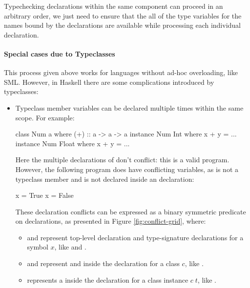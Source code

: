 \documentclass[dissertation.tex]{subfiles}
\begin{document}
{{        Typechecking declarations within the same component can proceed in an arbitrary order, we just need to ensure that the all of the type variables for the names bound by the declarations are available while processing each individual declaration.

        \paragraph*{Special cases due to Typeclasses}

        This process given above works for languages without ad-hoc overloading, like SML. However, in Haskell there are some complications introduced by typeclasses:

        \begin{itemize}
        \item
        {
            Typeclass member variables can be declared multiple times within the same scope. For example:
            
            \begin{haskellfigure}
            class Num a where
                (+) :: a -> a -> a
            instance Num Int where
                x + y = ...
            instance Num Float where
                x + y = ...
            \end{haskellfigure}

            Here the multiple declarations of \haskell{(+)} don't conflict: this is a valid program. However, the following program does have conflicting variables, as  is not a typeclass member and is not declared inside an  declaration:

            \begin{haskellfigure}
            x = True
            x = False
            \end{haskellfigure}

            These declaration conflicts can be expressed as a binary symmetric predicate on declarations, as presented in Figure \ref{fig:conflict-grid}, where:

            \begin{itemize}
            \item
            {
                 and  represent top-level declaration and type-signature declarations for a symbol \(x\), like  and .
            }
            \item
            {
                 and  represent  and  inside the declaration for a class \(c\), like .
            }
            \item
            {
                 represents a  inside the declaration for a class instance \(c\;t\), like .
            }
            \end{itemize}

}
\end{itemize}}}
\end{document}
